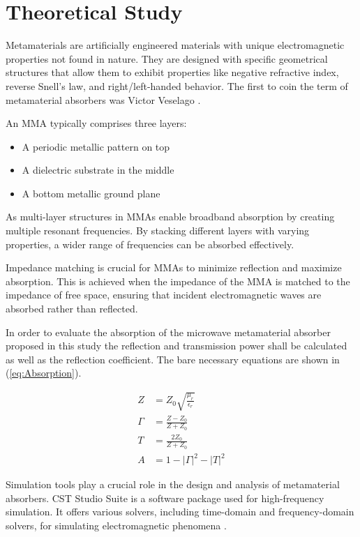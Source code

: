 \section{\textsf{Theoretical Study}} Metamaterials are artificially engineered materials
    with unique electromagnetic properties not found in nature. They are designed with
    specific geometrical structures that allow them to exhibit properties like negative
    refractive index, reverse Snell's law, and right/left-handed behavior. The first to
    coin the term of metamaterial absorbers was Victor Veselago \cite{veselago_left_2006}.
    
    An MMA typically comprises three layers: 
    \begin{itemize}
        \item A periodic metallic pattern on top
        \item A dielectric substrate in the middle
        \item A bottom metallic ground plane
    \end{itemize}
    As multi-layer structures in MMAs enable broadband absorption by creating multiple
    resonant frequencies. By stacking different layers with varying properties, a wider
    range of frequencies can be absorbed effectively.

    Impedance matching is crucial for MMAs to minimize reflection and maximize absorption.
    This is achieved when the impedance of the MMA is matched to the impedance of free
    space, ensuring that incident electromagnetic waves are absorbed rather than
    reflected.

    In order to evaluate the absorption of the microwave metamaterial absorber proposed in
    this study \cite{zhang_design_2023} the reflection and transmission power shall be
    calculated as well as the reflection coefficient. The bare necessary equations are
    shown in (\ref{eq:Absorption}).

    \begin{subequations}
        \label{eq:Absorption}
        \begin{align}
            Z & = Z_0 \sqrt{\frac{\mu_r}{\epsilon_r}} \label{eq:Z} \\
            \Gamma & = \frac{Z - Z_0}{Z + Z_0} \label{eq:ReflectionCoeff} \\
            T & = \frac{2Z_0}{Z + Z_0} \label{eq:TransmissionCoeff} \\
            A & = 1 - |\Gamma|^2 - |T|^2 \label{eq:Absorbance}
        \end{align} 
    \end{subequations}

    Simulation tools play a crucial role in the design and analysis of metamaterial
    absorbers. CST Studio Suite is a software package used for high-frequency simulation.
    It offers various solvers, including time-domain and frequency-domain solvers, for
    simulating electromagnetic phenomena \cite{jha_design_2018}.
    